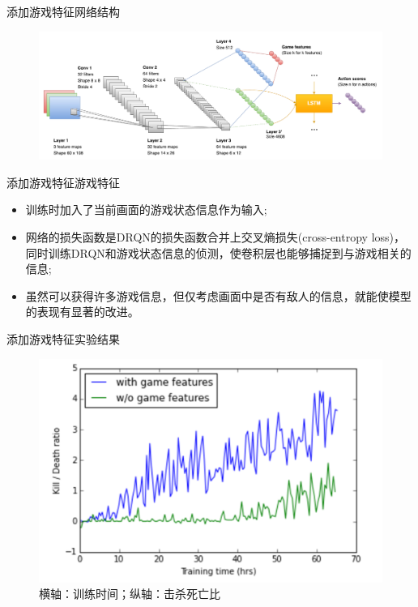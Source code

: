 \documentclass[10pt]{beamer}
\begin{document}
	\begin{frame}{添加游戏特征}{网络结构}
		\begin{figure}
			\centering
			\includegraphics[width=0.9\linewidth]{pictures/drqn-with-game-features}
		\end{figure}
		
	\end{frame}

	\begin{frame}{添加游戏特征}{游戏特征}
		\begin{itemize}
			\item<2-> 训练时加入了当前画面的游戏状态信息作为输入;
			
			\item<3-> 网络的损失函数是DRQN的损失函数合并上交叉熵损失(cross-entropy loss)，同时训练DRQN和游戏状态信息的侦测，使卷积层也能够捕捉到与游戏相关的信息;
			
			\item<4-> 虽然可以获得许多游戏信息，但仅考虑画面中是否有敌人的信息，就能使模型的表现有显著的改进。
		\end{itemize}
	\end{frame}

	\begin{frame}{添加游戏特征}{实验结果}
		\begin{figure}
			\centering
			\includegraphics[width=0.7\linewidth]{pictures/with-game-features-result}
			\caption{横轴：训练时间；纵轴：击杀死亡比}
			\label{fig:with-game-features-result}
		\end{figure}
	\end{frame}
\end{document}

